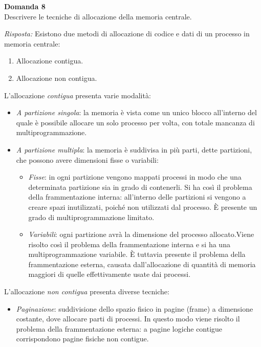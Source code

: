 \documentclass{article}
\newenvironment{problem}[2][Domanda]
    { \begin{mdframed}[backgroundcolor=gray!20] \textbf{#1 #2} \\}
    {  \end{mdframed}}
\newenvironment{solution}
    {\textit{Risposta:}}
    {}
\begin{document}
\begin{problem}{8}
Descrivere le tecniche di allocazione della memoria centrale.
\end{problem}
\begin{solution}
Esistono due metodi di allocazione di codice e dati di un processo in memoria centrale:
\begin{enumerate}
    \item Allocazione contigua.
    \item Allocazione non contigua.
\end{enumerate}
L’allocazione \textit{contigua} presenta varie modalità:
\begin{itemize}
    \item \emph{A partizione singola}: la memoria è vista come un unico blocco all’interno del quale è possibile allocare un solo processo per volta, con totale mancanza di multiprogrammazione.
    \item \emph{A partizione multipla}: la memoria è suddivisa in più parti, dette partizioni, che possono avere dimensioni fisse o variabili:
    \begin{itemize}
        \item \emph{Fisse}: in ogni partizione vengono mappati processi in modo che una determinata partizione sia in grado di contenerli.
        \newline Si ha così il problema della frammentazione interna: all'interno delle partizioni si vengono a creare spazi inutilizzati, poiché non utilizzati dal processo.
        \newline
        È presente un grado di multiprogrammazione limitato.
        \item \emph{Variabili}: ogni partizione avrà la dimensione del processo allocato.\newline Viene risolto così il problema della frammentazione interna e si ha una multiprogrammazione variabile.
        \newline È tuttavia presente il problema della frammentazione esterna, causata dall’allocazione di quantità di memoria maggiori di quelle effettivamente usate dai processi.
    \end{itemize}
\end{itemize}
L’allocazione \textit{non contigua} presenta diverse tecniche:
\begin{itemize}
    \item \emph{Paginazione}: suddivisione dello spazio fisico in pagine (frame) a dimensione costante, dove allocare parti di processi.
    \newline In questo modo viene risolto il problema della frammentazione esterna: a pagine logiche contigue corrispondono pagine fisiche non contigue.

\end{itemize}
\end{solution}
\end{document}
